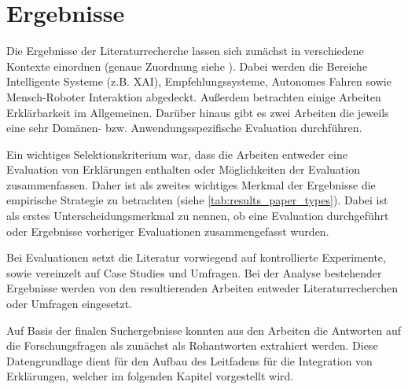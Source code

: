 \newpage

\section{Ergebnisse}

Die Ergebnisse der Literaturrecherche lassen sich zunächst in verschiedene Kontexte einordnen (genaue Zuordnung siehe ). Dabei werden die Bereiche Intelligente Systeme (z.B. XAI), Empfehlungssysteme, Autonomes Fahren sowie Mensch-Roboter Interaktion abgedeckt. Außerdem betrachten einige Arbeiten Erklärbarkeit im Allgemeinen. Darüber hinaus gibt es zwei Arbeiten die jeweils eine sehr Domänen- bzw. Anwendungsspezifische Evaluation durchführen.

Ein wichtiges Selektionskriterium war, dass die Arbeiten entweder eine Evaluation von Erklärungen enthalten oder Möglichkeiten der Evaluation zusammenfassen. Daher ist als zweites wichtiges Merkmal der Ergebnisse die empirische Strategie zu betrachten (siehe \autoref{tab:results_paper_types}). Dabei ist als erstes Unterscheidungsmerkmal zu nennen, ob eine Evaluation durchgeführt oder Ergebnisse vorheriger Evaluationen zusammengefasst wurden.

Bei Evaluationen setzt die Literatur vorwiegend auf kontrollierte Experimente, sowie vereinzelt auf Case Studies und Umfragen. Bei der Analyse bestehender Ergebnisse werden von den resultierenden Arbeiten entweder Literaturrecherchen oder Umfragen eingesetzt.

Auf Basis der finalen Suchergebnisse konnten aus den Arbeiten die Antworten auf die Forschungsfragen als zunächst als Rohantworten extrahiert werden. Diese Datengrundlage dient für den Aufbau des Leitfadens für die Integration von Erklärungen, welcher im folgenden Kapitel vorgestellt wird.

